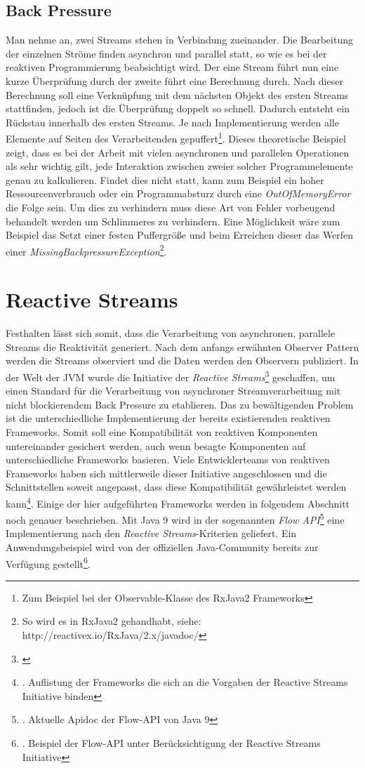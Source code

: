 \subsection{Back Pressure}
Man nehme an, zwei Streams stehen in Verbindung zueinander. Die Bearbeitung der einzelnen Ströme finden asynchron und parallel statt, so wie es bei der reaktiven Programmierung beabsichtigt wird. Der eine Stream führt nun eine kurze Überprüfung durch der zweite führt eine Berechnung durch. Nach dieser Berechnung soll eine Verknüpfung mit dem nächsten Objekt des ersten Streams stattfinden, jedoch ist die Überprüfung doppelt so schnell. Dadurch entsteht ein Rückstau innerhalb des ersten Streams. Je nach Implementierung werden alle Elemente auf Seiten des Verarbeitenden gepuffert\footnote{Zum Beispiel bei der Observable-Klasse des RxJava2 Frameworks}. Dieses theoretische Beispiel zeigt, dass es bei der Arbeit mit vielen asynchronen und parallelen Operationen als sehr wichtig gilt, jede Interaktion zwischen zweier solcher Programmelemente genau zu kalkulieren. Findet dies nicht statt, kann zum Beispiel ein hoher Ressourcenverbrauch oder ein Programmabsturz durch eine \textit{OutOfMemoryError} die Folge sein. Um dies zu verhindern muss diese Art von Fehler vorbeugend behandelt werden um Schlimmeres zu verhindern. Eine Möglichkeit wäre zum Beispiel das Setzt einer festen Puffergröße und beim Erreichen dieser das Werfen einer \textit{MissingBackpressureException}\footnote{So wird es in RxJava2 gehandhabt, siehe: http://reactivex.io/RxJava/2.x/javadoc/}.
\section{Reactive Streams}
Festhalten lässt sich somit, dass die Verarbeitung von asynchronen, parallele Streams die Reaktivität generiert. Nach dem anfangs erwähnten Observer Pattern werden die Streams observiert und die Daten werden den Observern publiziert. In der Welt der JVM wurde die Initiative der \textit{Reactive Streams}\footnote{\cite{reactivestreams}} geschaffen, um einen Standard für die Verarbeitung von asynchroner Streamverarbeitung mit nicht blockierendem Back Pressure zu etablieren. Das zu bewältigenden Problem ist die unterschiedliche Implementierung der bereits existierenden reaktiven Frameworks. Somit soll eine Kompatibilität von reaktiven Komponenten untereinander gesichert werden, auch wenn besagte Komponenten auf unterschiedliche Frameworks basieren. Viele Entwicklerteams von reaktiven Frameworks haben sich mittlerweile dieser Initiative angeschlossen und die Schnittstellen soweit angepasst, dass diese Kompatibilität gewährleistet werden kann\footnote{\cite{rs.implementations}. Auflistung der Frameworks die sich an die Vorgaben der Reactive Streams Initiative binden}. Einige der hier aufgeführten Frameworks werden in folgendem Abschnitt noch genauer beschrieben. Mit Java 9 wird in der sogenannten \textit{Flow API}\footnote{\cite{fl.apidoc}. Aktuelle Apidoc der Flow-API von Java 9} eine Implementierung nach den \textit{Reactive Streams}-Kriterien geliefert. Ein Anwendungsbeispiel wird von der offiziellen Java-Community bereits zur Verfügung gestellt\footnote{\cite{flowex}. Beispiel der Flow-API unter Berücksichtigung der Reactive Streams Initiative}.  
